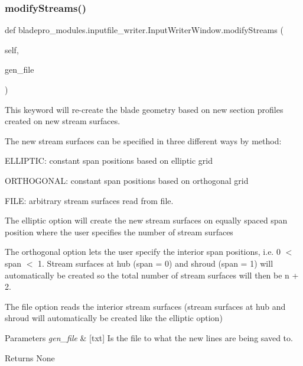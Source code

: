 \subsubsection{\texorpdfstring{modify\+Streams()}{modifyStreams()}}
{\footnotesize\ttfamily def bladepro\+\_\+modules.\+inputfile\+\_\+writer.\+Input\+Writer\+Window.\+modify\+Streams (\begin{DoxyParamCaption}\item[{}]{self,  }\item[{}]{gen\+\_\+file }\end{DoxyParamCaption})}



This keyword will re-\/create the blade geometry based on new section profiles created on new stream surfaces. 

The new stream surfaces can be specified in three different ways by method\+:

\begin{DoxyItemize}
\item {\ttfamily E\+L\+L\+I\+P\+T\+IC\+:} constant span positions based on elliptic grid \item {\ttfamily O\+R\+T\+H\+O\+G\+O\+N\+AL\+:} constant span positions based on orthogonal grid \item {\ttfamily F\+I\+LE\+:} arbitrary stream surfaces read from file.\end{DoxyItemize}
The elliptic option will create the new stream surfaces on equally spaced span position where the user specifies the number of stream surfaces

The orthogonal option lets the user specify the interior span positions, i.\+e. 0 $<$ span $<$ 1. Stream surfaces at hub (span = 0) and shroud (span = 1) will automatically be created so the total number of stream surfaces will then be n + 2.

The file option reads the interior stream surfaces (stream surfaces at hub and shroud will automatically be created like the elliptic option)


\begin{DoxyParams}{Parameters}
{\em gen\+\_\+file} & \mbox{[}txt\mbox{]} Is the file to what the new lines are being saved to. \\
\hline
\end{DoxyParams}
\begin{DoxyReturn}{Returns}
None 
\end{DoxyReturn}
\hypertarget{classbladepro__modules_1_1inputfile__writer_1_1_input_writer_window_ade4195a752861e46586e7b163136620f}{}\label{classbladepro__modules_1_1inputfile__writer_1_1_input_writer_window_ade4195a752861e46586e7b163136620f} 
